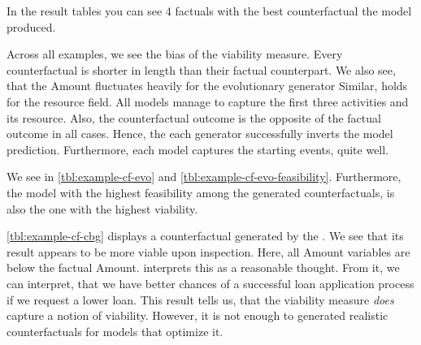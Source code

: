 \documentclass[./../../paper.tex]{subfiles}
\begin{document}
In the result tables you can see 4 factuals with the best counterfactual the model produced. 







% 

Across all examples, we see the bias of the viability measure. Every counterfactual is shorter in length than their factual counterpart. 
We also see, that the Amount fluctuates heavily for the evolutionary generator 
Similar, holds for the resource field. All models manage to capture the first three activities and its resource. Also, the counterfactual outcome is the opposite of the factual outcome in all cases. Hence, the each generator successfully inverts the model prediction. Furthermore, each model captures the starting events, quite well.

We see in \autoref{tbl:example-cf-evo} and \autoref{tbl:example-cf-evo-feasibility}. 
Furthermore, the model with the highest feasibility among the \ModelEVO generated counterfactuals, is also the one with the highest viability. 

\autoref{tbl:example-cf-cbg} displays a counterfactual generated by the \ModelCBG. We see that its result appears to be more viable upon inspection. Here, all Amount variables are below the factual Amount. \citeauthor{hsieh_DiCE4ELInterpretingProcess_2021} interprets this as a reasonable thought. From it, we can interpret, that we have better chances of a successful loan application process if we request a lower loan. This result tells us, that the viability measure \emph{does} capture a notion of viability. However, it is not enough to generated realistic counterfactuals for models that optimize it. 



\end{document}
